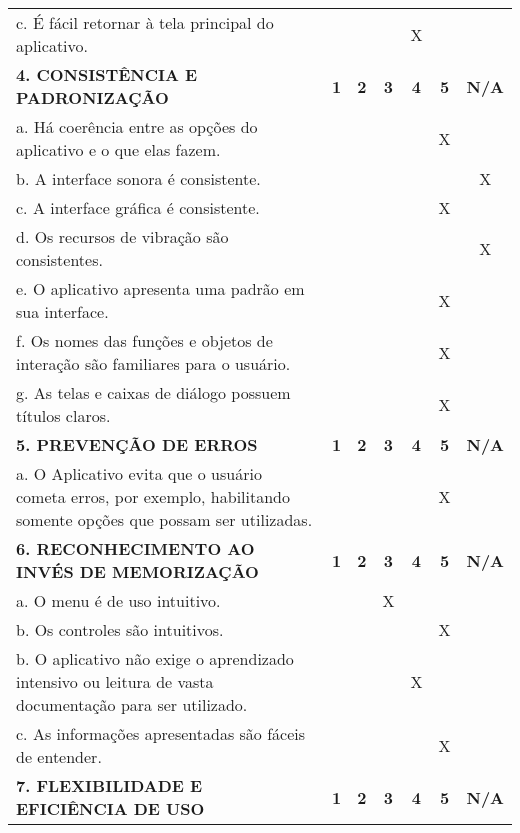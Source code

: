 \documentclass[portuguese,oneside]{tcc}
\begin{document}
\begin{center}
\begin{longtabu}{|L{25em}|c|c|c|c|c|c|}
																	c. É fácil retornar à tela principal do aplicativo. & & & & X & & \\ 
																	\textbf{4. CONSISTÊNCIA E PADRONIZAÇÃO} & \textbf{1} & \textbf{2} & \textbf{3} & \textbf{4} & \textbf{5} & \textbf{N/A} \\ 
																	a. Há coerência entre as opções do aplicativo e o que elas fazem. & & & & & X & \\ 
																	b. A interface sonora é consistente. & & & & & & X \\ 
																	c. A interface gráfica é consistente. & & & & & X & \\ 
																	d. Os recursos de vibração são consistentes. & & & & & & X \\ 
																	e. O aplicativo apresenta uma padrão em sua interface. & & & & & X & \\ 
																	f. Os nomes das funções e objetos de interação são familiares para o usuário. & & & & & X & \\ 
																	g. As telas e caixas de diálogo possuem títulos claros. & & & & & X & \\ 
																	\textbf{5. PREVENÇÃO DE ERROS} & \textbf{1} & \textbf{2} & \textbf{3} & \textbf{4} & \textbf{5} & \textbf{N/A} \\ 
																	a. O Aplicativo evita que o usuário cometa erros, por exemplo, habilitando somente opções que possam ser utilizadas. & & & & & X & \\ 
																	\textbf{6. RECONHECIMENTO AO INVÉS DE MEMORIZAÇÃO} & \textbf{1} & \textbf{2} & \textbf{3} & \textbf{4} & \textbf{5} & \textbf{N/A} \\ 
																	a. O  menu é de uso intuitivo. & & & X & & & \\ 
																	b. Os controles são intuitivos. & & & & & X & \\ 
																	b. O aplicativo não exige o aprendizado intensivo ou leitura de vasta documentação para ser utilizado. & & & & X & & \\ 
																	c. As informações apresentadas são fáceis de entender. & & & & & X & \\ 
																	\textbf{7. FLEXIBILIDADE E EFICIÊNCIA DE USO} & \textbf{1} & \textbf{2} & \textbf{3} & \textbf{4} & \textbf{5} & \textbf{N/A} \\ 

\end{longtabu}
\end{center}
\end{document}
